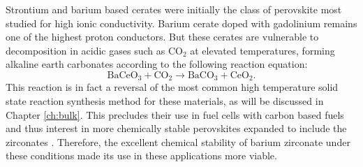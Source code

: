 Strontium and barium based cerates were initially the class of perovskite most studied for high ionic conductivity. Barium cerate doped with gadolinium remains one of the highest proton conductors. But these cerates are vulnerable to decomposition in acidic gases such as CO$_2$ at elevated temperatures, forming alkaline earth carbonates according to the following reaction equation:
\begin{equation}
\mathrm{BaCeO_3 + CO_2 \rightarrow BaCO_3 + CeO_2}.
\end{equation}
This reaction is in fact a reversal of the most common high temperature solid state reaction synthesis method for these materials, as will be discussed in Chapter \ref{ch:bulk}. This precludes their use in fuel cells with carbon based fuels and thus interest in more chemically stable perovskites expanded to include the zirconates \cite{SCHOLTEN1993}. Therefore, the excellent chemical stability of barium zirconate under these conditions made its use in these applications more viable.